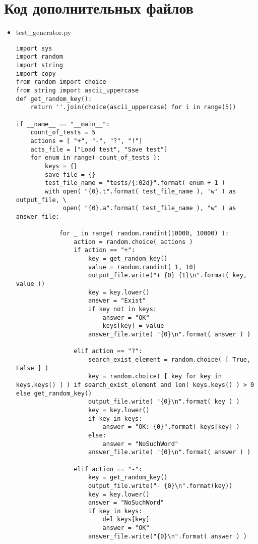 \documentclass[pdf, unicode, 12pt, a4paper,oneside,fleqn]{article}
\begin{document}
\section{Код дополнительных файлов}
\begin{itemize}
\item test\_generator.py
\lstset{language=Python}
\begin{lstlisting}
import sys
import random
import string
import copy
from random import choice
from string import ascii_uppercase
def get_random_key():
    return ''.join(choice(ascii_uppercase) for i in range(5))

if __name__ == "__main__":
    count_of_tests = 5
    actions = [ "+", "-", "?", "!"]
    acts_file = ["Load test", "Save test"]
    for enum in range( count_of_tests ):
        keys = {}
        save_file = {}
        test_file_name = "tests/{:02d}".format( enum + 1 )
        with open( "{0}.t".format( test_file_name ), 'w' ) as output_file, \
             open( "{0}.a".format( test_file_name ), "w" ) as answer_file:

            for _ in range( random.randint(10000, 10000) ):
                action = random.choice( actions )
                if action == "+":
                    key = get_random_key()
                    value = random.randint( 1, 10)
                    output_file.write("+ {0} {1}\n".format( key, value ))
                    key = key.lower()
                    answer = "Exist"
                    if key not in keys:
                        answer = "OK"
                        keys[key] = value
                    answer_file.write( "{0}\n".format( answer ) )

                elif action == "?":
                    search_exist_element = random.choice( [ True, False ] )
                    key = random.choice( [ key for key in keys.keys() ] ) if search_exist_element and len( keys.keys() ) > 0 else get_random_key()
                    output_file.write( "{0}\n".format( key ) )
                    key = key.lower()
                    if key in keys:
                        answer = "OK: {0}".format( keys[key] )
                    else:
                        answer = "NoSuchWord"
                    answer_file.write( "{0}\n".format( answer ) ) 
                    
                elif action == "-":
                    key = get_random_key()
                    output_file.write("- {0}\n".format(key))
                    key = key.lower()
                    answer = "NoSuchWord"
                    if key in keys:
                        del keys[key]
                        answer = "OK"
                    answer_file.write("{0}\n".format( answer ) )
                

\end{lstlisting}
\end{itemize}
\end{document}
